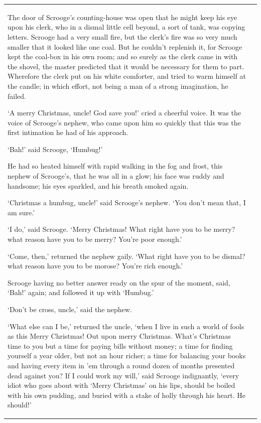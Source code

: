 \documentclass[11pt,twoside]{article}\makeatletter
\begin{document}
\begin{longtable}{P{0.19558457711442787\textwidth}P{0.6544154228855721\textwidth}}
The door of Scrooge's counting-house was open that he might keep his eye upon his clerk, who in a dismal little cell beyond, a sort of tank, was copying letters. Scrooge had a very small fire, but the clerk's fire was so very much smaller that it looked like one coal. But he couldn't replenish it, for Scrooge kept the coal-box in his own room; and so surely as the clerk came in with the shovel, the master predicted that it would be necessary for them to part. Wherefore the clerk put on his white comforter, and tried to warm himself at the candle; in which effort, not being a man of a strong imagination, he failed. \par
‘A merry Christmas, uncle! God save you!’ cried a cheerful voice. It was the voice of Scrooge's nephew, who came upon him so quickly that this was the first intimation he had of his approach. \par
‘Bah!’ said Scrooge, ‘Humbug!’\par
He had so heated himself with rapid walking in the fog and frost, this nephew of Scrooge's, that he was all in a glow; his face was ruddy and handsome; his eyes sparkled, and his breath smoked again. \par
‘Christmas a humbug, uncle!’ said Scrooge's nephew. ‘You don't mean that, I am sure.’\par
‘I do,’ said Scrooge. ‘Merry Christmas! What right have you to be merry? what reason have you to be merry? You're poor enough.’\par
‘Come, then,’ returned the nephew gaily. ‘What right have you to be dismal? what reason have you to be morose? You're rich enough.’\par
Scrooge having no better answer ready on the spur of the moment, said, ‘Bah!’ again; and followed it up with ‘Humbug.’\par
‘Don't be cross, uncle,’ said the nephew.\par
‘What else can I be,’ returned the uncle, ‘when I live in such a world of fools as this Merry Christmas! Out upon merry Christmas. What's Christmas time to you but a time for paying bills without money; a time for finding yourself a year older, but not an hour richer; a time for balancing your books and having every item in 'em through a round dozen of months presented dead against you? If I could work my will,’ said Scrooge indignantly, ‘every idiot who goes about with ‘Merry Christmas’ on his lips, should be boiled with his own pudding, and buried with a stake of holly through his heart. He should!’\par

\end{longtable}
\end{document}
